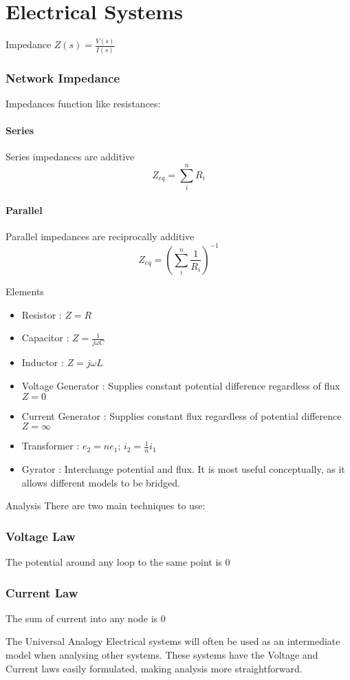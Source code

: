 \documentclass{../templates/topic}
\begin{document}
\chapter{Electrical Systems}

\begin{section}{Impedance}
	 $Z(s)=\frac{V(s)}{I(s)}$
	
	\subsection{Network Impedance}
	Impedances function like resistances:
	\subsubsection*{Series}
	Series impedances are additive
	\begin{equation}
		Z_{eq} = \sum_{i}^{n}{R_i}
	\end{equation}
	\subsubsection*{Parallel}
	Parallel impedances are reciprocally additive
	\begin{equation}
		Z_{eq} = (\sum_{i}^{n}{\frac{1}{R_i}})^{-1}
	\end{equation}
\end{section}

\begin{section}{Elements}
	\begin{itemize}
		\item Resistor : $Z=R$
		\item Capacitor : $Z=\frac{1}{j\omega C}$
		\item Inductor : $Z=j\omega L$
		\item Voltage Generator : Supplies constant potential difference regardless of flux $Z=0$
		\item Current Generator : Supplies constant flux regardless of potential difference $Z=\infty$
		\item Transformer : $e_2 = ne_1$; $i_2 = \frac{1}{n}i_1$
		\item Gyrator : Interchange potential and flux. It is most useful conceptually, as it allows different models to be bridged.
	\end{itemize}
\end{section}


\begin{section}{Analysis}
	There are two main techniques to use:
	\subsection{Voltage Law}
		The potential around any loop to the same point is 0
	\subsection{Current Law}
		The sum of current into any node is 0
\end{section}

\begin{section}{The Universal Analogy}
	Electrical systems will often be used as an intermediate model when analysing other systems. These systems have the Voltage and Current laws easily formulated, making analysis more straightforward.
		
\end{section}
\end{document}
